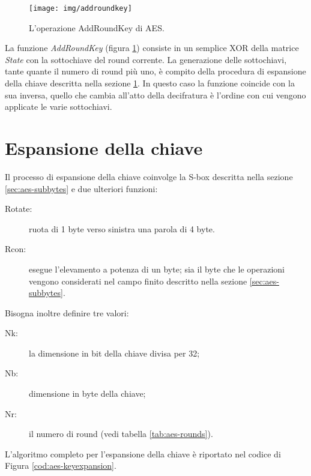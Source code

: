 \documentclass[12pt,a4paper,oneside]{book}
\begin{document}
\begin{figure}[h]
\begin{center}
\texttt{[image: img/addroundkey]}
\caption{L'operazione AddRoundKey di AES.\label{fig:aes-addroundkey}}
\end{center}
\end{figure}

La funzione \textit{AddRoundKey} (figura \ref{fig:aes-addroundkey}) consiste in un semplice XOR della matrice \textit{State} con la sottochiave del round corrente. La generazione delle sottochiavi, tante quante il numero di round più uno, è compito della procedura di espansione della chiave descritta nella sezione \ref{sec:aes-key-schedule}. In questo caso la funzione coincide con la sua inversa, quello che cambia all'atto della decifratura è l'ordine con cui vengono applicate le varie sottochiavi.

\section{Espansione della chiave}
\label{sec:aes-key-schedule}

Il processo di espansione della chiave coinvolge la \ac{S-box} descritta nella sezione \ref{sec:aes-subbytes} e due ulteriori funzioni:
\begin{description}
\item[Rotate:] ruota di 1 byte verso sinistra una parola di 4 byte.
\item[Rcon:] esegue l'elevamento a potenza di un byte; sia il byte che le operazioni vengono considerati nel campo finito descritto nella sezione \ref{sec:aes-subbytes}.
\end{description}

Bisogna inoltre definire tre valori:
\begin{description}
\item[Nk:] la dimensione in bit della chiave divisa per 32;
\item[Nb:] dimensione in byte della chiave;
\item[Nr:] il numero di round (vedi tabella \ref{tab:aes-rounds}).
\end{description}

L'algoritmo completo per l'espansione della chiave è riportato nel codice di Figura \ref{cod:aes-keyexpansion}.
\end{document}
